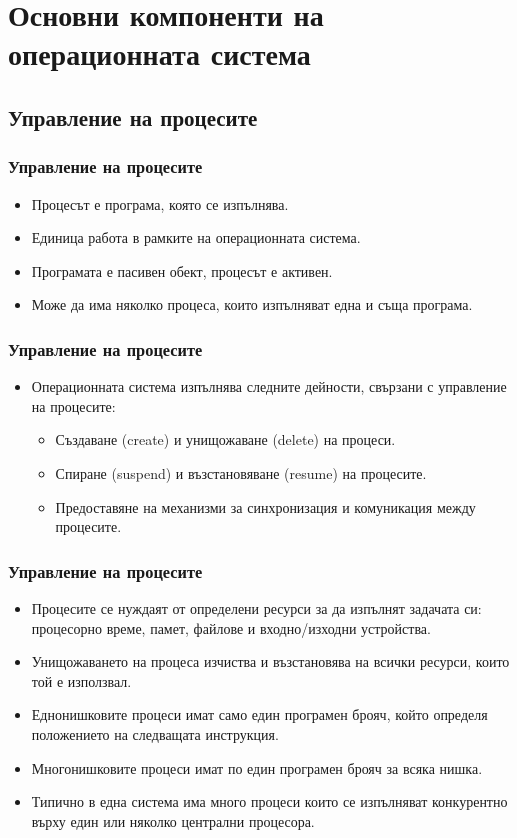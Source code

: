 \documentclass[ignorenonframetext, hyperref=unicode]{beamer}
\begin{document}
\section{Основни компоненти на операционната система}

\subsection{Управление на процесите}
\begin{frame}
\frametitle{Управление на процесите}
\begin{itemize}
\item Процесът е програма, която се изпълнява.
\item Единица работа в рамките на операционната система.
\item Програмата е пасивен обект, процесът е активен.
\item Може да има няколко процеса, които изпълняват една и съща програма.
\end{itemize}
\end{frame}

    
\begin{frame}
\frametitle{Управление на процесите}
\begin{itemize}
\item Операционната система изпълнява следните дейности, свързани с управление
на процесите:
\begin{itemize}
  \item Създаване (create) и унищожаване (delete) на процеси.
  \item Спиране (suspend) и възстановяване (resume) на процесите.
  \item Предоставяне на механизми за синхронизация и комуникация между
  процесите.
\end{itemize}
\end{itemize}
\end{frame}

\begin{frame}
\frametitle{Управление на процесите}
\begin{itemize}
\item Процесите се нуждаят от определени ресурси за да изпълнят задачата си:
процесорно време, памет, файлове и входно/изходни устройства.
\item Унищожаването на процеса изчиства и възстановява на всички ресурси, които
той е използвал.
\item Еднонишковите процеси имат само един програмен брояч, който определя
положението на следващата инструкция.
\item Многонишковите процеси имат по един програмен брояч за всяка нишка. 
\item Типично в една система има много процеси които се изпълняват конкурентно
върху един или няколко централни процесора.
\end{itemize}
\end{frame}
\end{document}

